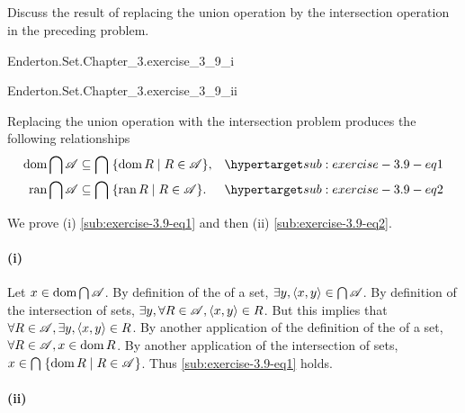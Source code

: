 \documentclass{report}
\begin{document}
\subsection{}%

  Discuss the result of replacing the union operation by the intersection
    operation in the preceding problem.

    {Enderton.Set.Chapter\_3.exercise\_3\_9\_i}

    {Enderton.Set.Chapter\_3.exercise\_3\_9\_ii}

  \begin{answer}
    Replacing the union operation with the intersection problem produces the
      following relationships
      \begin{align}
        \dom{\bigcap{\mathscr{A}}}
          & \subseteq \bigcap\;\{ \dom{R} \mid R \in \mathscr{A} \},
          & \hyperlabel{sub:exercise-3.9-eq1} \\
        \ran{\bigcap{\mathscr{A}}}
          & \subseteq \bigcap\;\{ \ran{R} \mid R \in \mathscr{A} \}.
          & \hyperlabel{sub:exercise-3.9-eq2}
      \end{align}

    We prove (i) \eqref{sub:exercise-3.9-eq1} and then (ii)
      \eqref{sub:exercise-3.9-eq2}.

    \paragraph{(i)}%

      Let $x \in \mathop{\text{dom}}{\bigcap{\mathscr{A}}}$.
      By definition of the  of a set,
        $\exists y, \left< x, y \right> \in \bigcap{\mathscr{A}}$.
      By definition of the intersection of sets,
        $\exists y, \forall R \in \mathscr{A}, \left< x, y \right> \in R$.
      But this implies that
        $\forall R \in \mathscr{A}, \exists y, \left< x, y \right> \in R$.
      By another application of the definition of the  of a
        set, $\forall R \in \mathscr{A}, x \in \mathop{\text{dom}}{R}$.
      By another application of the intersection of sets,
        $x \in \bigcap\;\{ \mathop{\text{dom}}{R} \mid R \in \mathscr{A} \}$.
        Thus \eqref{sub:exercise-3.9-eq1} holds.

    \paragraph{(ii)}%


\end{answer}
\end{document}
